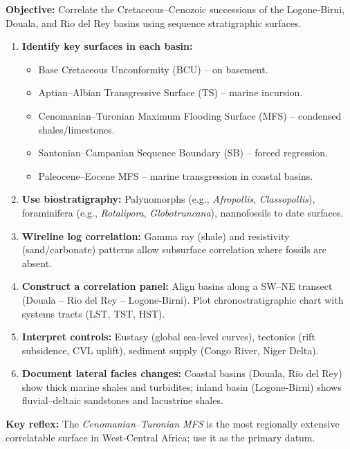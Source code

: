 \documentclass[11pt]{article}
\newcommand{\cle}[1]{{\popxbold\color{popdark}#1}}
\begin{document}
\begin{methode}
\textbf{Objective:} Correlate the Cretaceous–Cenozoic successions of the \cle{Logone‑Birni}, \cle{Douala}, and \cle{Rio del Rey} basins using sequence stratigraphic surfaces.
\begin{enumerate}
\item \textbf{Identify key surfaces in each basin:} 
\begin{itemize}
\item \cle{Base Cretaceous Unconformity (BCU)} – on basement.
\item \cle{Aptian–Albian Transgressive Surface (TS)} – marine incursion.
\item \cle{Cenomanian–Turonian Maximum Flooding Surface (MFS)} – condensed shales/limestones.
\item \cle{Santonian–Campanian Sequence Boundary (SB)} – forced regression.
\item \cle{Paleocene–Eocene MFS} – marine transgression in coastal basins.
\end{itemize}
\item \textbf{Use biostratigraphy:} Palynomorphs (e.g., \emph{Afropollis}, \emph{Classopollis}), foraminifera (e.g., \emph{Rotalipora}, \emph{Globotruncana}), nannofossils to date surfaces.
\item \textbf{Wireline log correlation:} Gamma ray (shale) and resistivity (sand/carbonate) patterns allow subsurface correlation where fossils are absent.
\item \textbf{Construct a correlation panel:} Align basins along a SW–NE transect (Douala – Rio del Rey – Logone‑Birni). Plot chronostratigraphic chart with systems tracts (LST, TST, HST).
\item \textbf{Interpret controls:} Eustasy (global sea‑level curves), tectonics (rift subsidence, CVL uplift), sediment supply (Congo River, Niger Delta).
\item \textbf{Document lateral facies changes:} Coastal basins (Douala, Rio del Rey) show thick marine shales and turbidites; inland basin (Logone‑Birni) shows fluvial–deltaic sandstones and lacustrine shales.
\end{enumerate}
\textbf{Key reflex:} The \emph{Cenomanian–Turonian MFS} is the most regionally extensive correlatable surface in West‑Central Africa; use it as the primary datum.
\end{methode}
\end{document}
